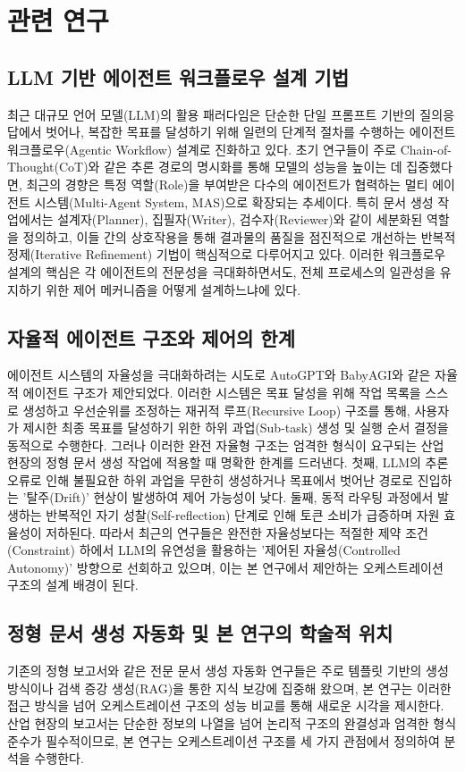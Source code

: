 \documentclass[10pt,twocolumn]{article}
\begin{document}
\section{관련 연구}
\subsection{LLM 기반 에이전트 워크플로우 설계 기법}
최근 대규모 언어 모델(LLM)의 활용 패러다임은 단순한 단일 프롬프트 기반의 질의응답에서 벗어나, 복잡한 목표를 달성하기 위해 일련의 단계적 절차를 수행하는 에이전트 워크플로우(Agentic Workflow) 설계로 진화하고 있다. 초기 연구들이 주로 Chain-of-Thought(CoT)와 같은 추론 경로의 명시화를 통해 모델의 성능을 높이는 데 집중했다면, 최근의 경향은 특정 역할(Role)을 부여받은 다수의 에이전트가 협력하는 멀티 에이전트 시스템(Multi-Agent System, MAS)으로 확장되는 추세이다. 특히 문서 생성 작업에서는 설계자(Planner), 집필자(Writer), 검수자(Reviewer)와 같이 세분화된 역할을 정의하고, 이들 간의 상호작용을 통해 결과물의 품질을 점진적으로 개선하는 반복적 정제(Iterative Refinement) 기법이 핵심적으로 다루어지고 있다. 이러한 워크플로우 설계의 핵심은 각 에이전트의 전문성을 극대화하면서도, 전체 프로세스의 일관성을 유지하기 위한 제어 메커니즘을 어떻게 설계하느냐에 있다.

\subsection{자율적 에이전트 구조와 제어의 한계}
에이전트 시스템의 자율성을 극대화하려는 시도로 AutoGPT와 BabyAGI와 같은 자율적 에이전트 구조가 제안되었다. 이러한 시스템은 목표 달성을 위해 작업 목록을 스스로 생성하고 우선순위를 조정하는 재귀적 루프(Recursive Loop) 구조를 통해, 사용자가 제시한 최종 목표를 달성하기 위한 하위 과업(Sub-task) 생성 및 실행 순서 결정을 동적으로 수행한다. 그러나 이러한 완전 자율형 구조는 엄격한 형식이 요구되는 산업 현장의 정형 문서 생성 작업에 적용할 때 명확한 한계를 드러낸다. 첫째, LLM의 추론 오류로 인해 불필요한 하위 과업을 무한히 생성하거나 목표에서 벗어난 경로로 진입하는 '탈주(Drift)' 현상이 발생하여 제어 가능성이 낮다. 둘째, 동적 라우팅 과정에서 발생하는 반복적인 자기 성찰(Self-reflection) 단계로 인해 토큰 소비가 급증하며 자원 효율성이 저하된다. 따라서 최근의 연구들은 완전한 자율성보다는 적절한 제약 조건(Constraint) 하에서 LLM의 유연성을 활용하는 '제어된 자율성(Controlled Autonomy)' 방향으로 선회하고 있으며, 이는 본 연구에서 제안하는 오케스트레이션 구조의 설계 배경이 된다.

\subsection{정형 문서 생성 자동화 및 본 연구의 학술적 위치}
기존의 정형 보고서와 같은 전문 문서 생성 자동화 연구들은 주로 템플릿 기반의 생성 방식이나 검색 증강 생성(RAG)을 통한 지식 보강에 집중해 왔으며, 본 연구는 이러한 접근 방식을 넘어 오케스트레이션 구조의 성능 비교를 통해 새로운 시각을 제시한다. 산업 현장의 보고서는 단순한 정보의 나열을 넘어 논리적 구조의 완결성과 엄격한 형식 준수가 필수적이므로, 본 연구는 오케스트레이션 구조를 세 가지 관점에서 정의하여 분석을 수행한다.
\end{document}
